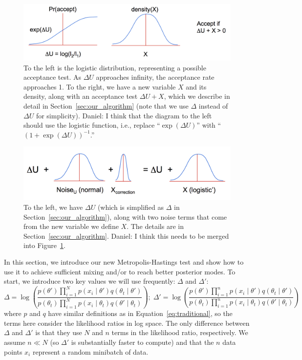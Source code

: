 \documentclass{article}
\begin{document}
\begin{figure}[t]
  \centering
  \includegraphics[width=\textwidth]{john_bair_fig01}
  \caption{
  To the left is the logistic distribution, representing a possible acceptance test. As $\Delta U$
  approaches infinity, the acceptance rate approaches 1. To the right, we have a new variable $X$
  and its density, along with an acceptance test $\Delta U + X$, which we describe in detail in
  Section~\ref{sec:our_algorithm} (note that we use $\Delta$ instead of $\Delta U$ for simplicity).
  {\color{blue}
  Daniel: I think that the diagram to the left should use the logistic function, i.e., replace
  ``$\exp(\Delta U)$'' with ``$(1+\exp(\Delta U))^{-1}$.''
  }
  }
  \label{fig:part1}
\end{figure}

\begin{figure}[t]
  \centering
  \includegraphics[width=\textwidth]{john_bair_fig02}
  \caption{
  To the left, we have $\Delta U$ (which is simplified as $\Delta$ in
  Section~\ref{sec:our_algorithm}), along with two noise terms that come from the new variable we
  define $X$. The details are in Section~\ref{sec:our_algorithm}.
  {\color{blue}
  Daniel: I think this needs to be merged into Figure~\ref{fig:part1}.
  }
  }
  \label{fig:part2}
\end{figure}

In this section, we introduce our new Metropolis-Hastings test and show how to use it to achieve
sufficient mixing and/or to reach better posterior modes. To start, we introduce two key values we
will use frequently: $\Delta$ and $\Delta'$:
\begin{equation}\label{eq:deltas}
\Delta = \log \left( \frac{p(\theta')\prod_{i=1}^N p(x_i \mid \theta')q(\theta_t \mid
\theta')}{p(\theta_t)\prod_{i=1}^N p(x_i \mid \theta_t)q(\theta' \mid
\theta_t)} \right);\;  \Delta' = \log \left( \frac{p(\theta')\prod_{i=1}^n p(x_i \mid \theta')q(\theta_t \mid
\theta')}{p(\theta_t)\prod_{i=1}^n p(x_i \mid \theta_t)q(\theta' \mid
\theta_t)} \right)
\end{equation}
where $p$ and $q$ have similar definitions as in Equation~\ref{eq:traditional}, so the terms here
consider the likelihood ratios in log space. The only difference between $\Delta$ and $\Delta'$ is
that they use $N$ and $n$ terms in the likelihood ratio, respectively. We assume $n \ll N$ (so
$\Delta'$ is substantially faster to compute) and that the $n$ data points $x_i$ represent a random
minibatch of data.
\end{document}
